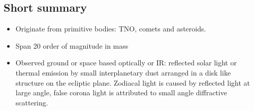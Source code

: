 \subsection{Short summary}
\begin{itemize}
\item Originate from primitive bodies: TNO, comets and asteroids.
\item Span 20 order of magnitude in mass
\item Observed ground or space based optically or IR: reflected solar light or thermal emission by small interplanetary dust arranged in a disk like structure on the ecliptic plane.
Zodiacal light is caused by reflected light at large angle, false corona light is attributed to small angle diffractive scattering.
\end{itemize}


